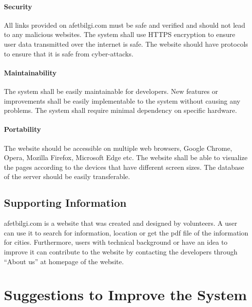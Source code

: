 \documentclass[12pt]{report}
\begin{document}
\subsubsection{Security}
All links provided on afetbilgi.com must be safe and verified and should not lead to any malicious websites.
The system shall use HTTPS encryption to ensure user data transmitted over the internet is safe.
The website should have protocols to ensure that it is safe from cyber-attacks.

\subsubsection{Maintainability}
The system shall be easily maintainable for developers.
New features or improvements shall be easily implementable to the system without causing any problems.
The system shall require minimal dependency on specific hardware.

\subsubsection{Portability}
The website should be accessible on multiple web browsers, Google Chrome, Opera, Mozilla Firefox, Microsoft Edge etc.
The website shall be able to visualize the pages according to the devices that have different screen sizes.
The database of the server should be easily transferable.

\section{Supporting Information}
afetbilgi.com is a website that was created and designed by volunteers.  A user can use it to search for information, location or get the pdf file of the 
information for cities. Furthermore, users with technical background or have an idea to improve it can contribute to the website by contacting the 
developers through “About us” at homepage of the website. 

\chapter{Suggestions to Improve the System}
\end{document}
